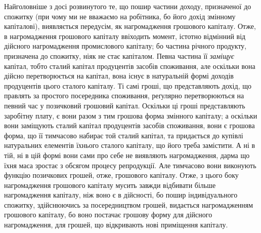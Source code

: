 Найголовніше з досі розвинутого те, що пошир частини доходу, призначеної
до спожитку (при чому ми не вважаємо на робітника, бо його дохід \deq{} змінному
капіталові), виявляється передусім, як нагромадження грошового капіталу.
Отже, в нагромадження грошового капіталу ввіходить момент, істотно відмінний
від дійсного нагромадження промислового капіталу; бо частина річного
продукту, призначена до спожитку, ніяк не стає капіталом. Певна частина її
\emph{заміщує} капітал, тобто сталий капітал продуцентів засобів споживання, але
оскільки вона дійсно перетворюється на капітал, вона існує в натуральній формі
доходів продуцентів цього сталого капіталу. Ті самі гроші, що представляють
дохід, що правлять за простого посередника споживання, реґулярно перетворюються
на певний час у позичковий грошовий капітал. Оскільки ці гроші
представляють заробітну плату, є вони разом з тим грошова форма змінного
капіталу; а оскільки вони заміщують сталий капітал продуцентів засобів споживання,
вони є грошова форма, що її тимчасово набирає той сталий капітал,
та придається до купівлі натуральних елементів їхнього сталого капіталу, що його
треба замістити. А ні в тій, ні в цій формі вони сами про себе не виявляють
нагромадження, дарма що їхня маса зростає з обсягом процесу репродукції.
Але тимчасово вони виконують функцію позичкових грошей, отже, грошового
капіталу. Отже, з цього боку нагромадження грошового капіталу мусить
завжди відбивати більше нагромадження капіталу, ніж воно є в дійсності, бо
пошир індивідуального спожитку, здійснюючись за посередництвом грошей, видається
нагромадженням грошового капіталу, бо воно постачає грошову форму для
дійсного нагромадження, для грошей, що відкривають нові приміщення капіталу.
